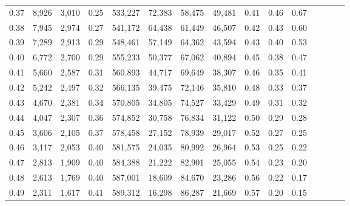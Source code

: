 \begin{tabular}{rrrcrrrrrrrrrrr}
0.37 &   8,926 &  3,010 &                                       0.25 &  533,227 &   72,383 &   58,475 &   49,481 &  0.41 &  0.46 &                         0.67 \\
0.38 &   7,945 &  2,974 &                                       0.27 &  541,172 &   64,438 &   61,449 &   46,507 &  0.42 &  0.43 &                         0.60 \\
0.39 &   7,289 &  2,913 &                                       0.29 &  548,461 &   57,149 &   64,362 &   43,594 &  0.43 &  0.40 &                         0.53 \\
0.40 &   6,772 &  2,700 &                                       0.29 &  555,233 &   50,377 &   67,062 &   40,894 &  0.45 &  0.38 &                         0.47 \\
0.41 &   5,660 &  2,587 &                                       0.31 &  560,893 &   44,717 &   69,649 &   38,307 &  0.46 &  0.35 &                         0.41 \\
0.42 &   5,242 &  2,497 &                                       0.32 &  566,135 &   39,475 &   72,146 &   35,810 &  0.48 &  0.33 &                         0.37 \\
0.43 &   4,670 &  2,381 &                                       0.34 &  570,805 &   34,805 &   74,527 &   33,429 &  0.49 &  0.31 &                         0.32 \\
0.44 &   4,047 &  2,307 &                                       0.36 &  574,852 &   30,758 &   76,834 &   31,122 &  0.50 &  0.29 &                         0.28 \\
0.45 &   3,606 &  2,105 &                                       0.37 &  578,458 &   27,152 &   78,939 &   29,017 &  0.52 &  0.27 &                         0.25 \\
0.46 &   3,117 &  2,053 &                                       0.40 &  581,575 &   24,035 &   80,992 &   26,964 &  0.53 &  0.25 &                         0.22 \\
0.47 &   2,813 &  1,909 &                                       0.40 &  584,388 &   21,222 &   82,901 &   25,055 &  0.54 &  0.23 &                         0.20 \\
0.48 &   2,613 &  1,769 &                                       0.40 &  587,001 &   18,609 &   84,670 &   23,286 &  0.56 &  0.22 &                         0.17 \\
0.49 &   2,311 &  1,617 &                                       0.41 &  589,312 &   16,298 &   86,287 &   21,669 &  0.57 &  0.20 &                         0.15 \\

\end{tabular}
